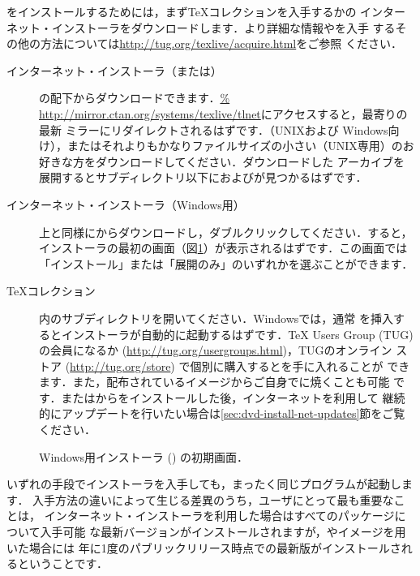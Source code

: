 \documentclass[uplatex,dvipdfmx]{jsarticle}
\begin{document}
\TL をインストールするためには，まず\TeX コレクション\DVD を入手するか\TL の
インターネット・インストーラをダウンロードします．より詳細な情報や\TL を入手
するその他の方法については\url{http://tug.org/texlive/acquire.html}をご参照
ください．
%
\begin{description}
\item[インターネット・インストーラ（または）]
\CTAN の配下からダウンロードできます．\url{%
http://mirror.ctan.org/systems/texlive/tlnet}にアクセスすると，最寄りの最新
ミラーにリダイレクトされるはずです．（UNIXおよび
Windows向け），またはそれよりもかなりファイルサイズの小さい（UNIX専用）のお好きな方をダウンロードしてください．ダウンロードした
アーカイブを展開するとサブディレクトリ以下におよびが見つかるはずです．

\item[インターネット・インストーラ（Windows用）]
上と同様に\CTAN からダウンロードし，ダブルクリックしてください．すると，
インストーラの最初の画面（図\ref{fig:nsis}）が表示されるはずです．この画面では
「インストール」または「展開のみ」のいずれかを選ぶことができます．

\item[\TeX コレクション\DVD]
\DVD 内のサブディレクトリを開いてください．Windowsでは，通常
\DVD を挿入するとインストーラが自動的に起動するはずです．{\TeX} Users Group
(TUG) の会員になるか (\url{http://tug.org/usergroups.html})，TUGのオンライン
ストア (\url{http://tug.org/store}) で個別に購入すると\DVD を手に入れることが
できます．また，配布されている\ISO イメージからご自身で\DVD に焼くことも可能
です．\DVD または\ISO から\TL をインストールした後，インターネットを利用して
継続的にアップデートを行いたい場合は\ref{sec:dvd-install-net-updates}節をご覧
ください．
\end{description}
%
\begin{figure}[tb]
\caption{Windows用インストーラ () の初期画面．}
\label{fig:nsis}
\end{figure}

いずれの手段でインストーラを入手しても，まったく同じプログラムが起動します．
入手方法の違いによって生じる差異のうち，ユーザにとって最も重要なことは，
インターネット・インストーラを利用した場合はすべてのパッケージについて入手可能
な最新バージョンがインストールされますが，\DVD や\ISO イメージを用いた場合には
年に1度のパブリックリリース時点での最新版がインストールされるということです．
\end{document}
